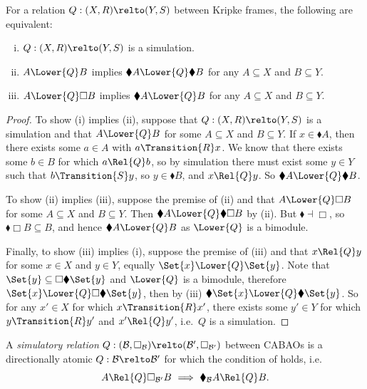 \documentclass[a4paper,UKenglish,cleveref, autoref]{lipics-v2021}
\begin{document}
\begin{lemma}\label{lemma:sim-black}\label{lemma:simulatory}
  For a relation \(Q : (X, R) \relto (Y, S)\) between Kripke frames,
  the following are equivalent:
  \begin{enumerate}[(i)]
  \item \(Q : (X, R) \relto (Y, S)\) is a simulation.
  \item \(A \Lower{Q} B\) implies
    \(\blacklozenge A \Lower{Q} \blacklozenge B\) for any
    \(A \subseteq X\) and \(B \subseteq Y\).
  \item \(A \Lower{Q} \Box B\) implies \(\blacklozenge A \Lower{Q} B\)
    for any \(A \subseteq X\) and \(B \subseteq Y\).
  \end{enumerate}
\end{lemma}
\begin{proof}
  To show (i) implies (ii), suppose that \(Q : (X, R) \relto (Y, S)\)
  is a simulation and that \(A \Lower{Q} B\) for some
  \(A \subseteq X\) and \(B \subseteq Y\). If
  \(x \in \blacklozenge A\), then there exists some \(a \in A\) with
  \(a \Transition{R} x\). We know that there exists some \(b \in B\)
  for which \(a \Rel{Q} b\), so by simulation there must exist some
  \(y \in Y\) such that \(b \Transition{S} y\), so
  \(y \in \blacklozenge B\), and \(x \Rel{Q} y\). So
  \(\blacklozenge A \Lower{Q} \blacklozenge B\).

  To show (ii) implies (iii), suppose the premise of (ii) and that
  \(A \Lower{Q} \Box B\) for some \(A \subseteq X\) and
  \(B \subseteq Y\).  Then
  \(\blacklozenge A \Lower{Q} \blacklozenge \Box B\) by (ii). But
  \(\blacklozenge \dashv \Box\), so
  \(\blacklozenge \Box B \subseteq B\), and hence
  \(\blacklozenge A \Lower{Q} B\) as \(\Lower{Q}\) is a bimodule.

  Finally, to show (iii) implies (i), suppose the premise of (iii) and
  that \(x \Rel{Q} y\) for some \(x \in X\) and \(y \in Y\), equally
  \(\Set{x} \Lower{Q} \Set{y}\). Note that
  \(\Set{y} \subseteq \Box \blacklozenge \Set{y}\) and \(\Lower{Q}\)
  is a bimodule, therefore
  \(\Set{x} \Lower{Q} \Box \blacklozenge \Set{y}\), then by (iii)
  \(\blacklozenge \Set{x} \Lower{Q} \blacklozenge \Set{y}\).  So for
  any \(x' \in X\) for which \(x \Transition{R} x'\), there exists
  some \(y' \in Y\) for which \(y \Transition{R} y'\) and
  \(x' \Rel{Q} y'\), i.e.\ \(Q\) is a simulation.
\end{proof}

\begin{definition}
  A \emph{simulatory relation}
  \(Q : (\mathcal{B}, \Box_\mathcal{B}) \relto (\mathcal{B}',
  \Box_{\mathcal{B}'})\) between CABAOs is a directionally atomic
  \(Q : \mathcal{B} \relto \mathcal{B}'\) for which the condition of
   holds, i.e.\
  \[
    A \Rel{Q} \Box_{\mathcal{B}'} B\
    \Longrightarrow\
    \blacklozenge_\mathcal{B} A \Rel{Q} B.
  \]
\end{definition}
\end{document}
